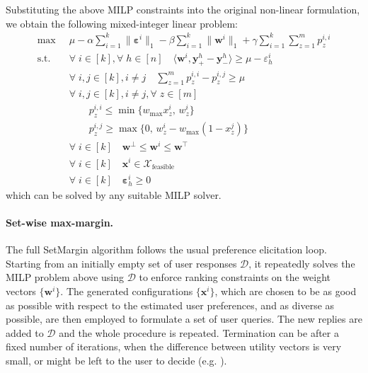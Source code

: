 \documentclass{article}
\renewcommand\[{\begin{equation}}
\renewcommand\]{\end{equation}}
\newcommand{\calvar}[1]{\ensuremath{\mathcal{#1}}}
\newcommand{\calD}{\calvar{D}}
\newcommand{\calX}{\calvar{X}}
\newcommand{\vecvar}[1]{\ensuremath{\boldsymbol{#1}}}
\newcommand{\vw}{\vecvar{w}}
\newcommand{\vx}{\vecvar{x}}
\newcommand{\vy}{\vecvar{y}}
\newcommand{\veps}{\vecvar{\varepsilon}}
\begin{document}
Substituting the above MILP constraints into the original non-linear
formulation, we obtain the following mixed-integer linear problem:
%
{\footnotesize
\begin{align}
    \max
        & \;\; \mu - \alpha \sum_{i=1}^k \| \veps^{i} \|_1 - \beta \sum_{i=1}^k \| \vw^{i} \|_1 + \gamma \sum_{i=1}^k \sum_{z=1}^m p^{i,i}_z
        \nonumber
    \\
    \text{s.t.}
        & \;\; \forall \; i \in [k], \forall \; h \in [n] \quad \langle \vw^{i}, \vy^{h}_+ - \vy^{h}_- \rangle \ge \mu - \varepsilon^{i}_h \nonumber
    \\
        & \;\; \forall \; i, j \in [k], i \neq j \quad \sum_{z=1}^m p^{i,i}_z - p^{i,j}_z \ge \mu
    \\
        & \;\; \forall \; i, j \in [k], i \neq j, \forall \; z \in [m] \nonumber
    \\
        & \;\; \qquad p^{i,i}_z \le \min \{ w_\text{max} x^{i}_z, \, w^{i}_z \} \label{eq:volatile1}
    \\
        & \;\; \qquad p^{i,j}_z \ge \max \{ 0, \, w^{i}_z - w_\text{max}(1 - x^{j}_z) \} \label{eq:volatile2}
    \\
        & \;\; \forall \; i \in [k] \quad \vw^\bot \le \vw^{i} \le \vw^\top \label{eq:wbounds2}
    \\
        & \;\; \forall \; i \in [k] \quad \vx^{i} \in \calX_{\text{feasible}} \nonumber
    \\
        & \;\; \forall \; i \in [k] \quad \veps^{i}_h \ge 0 \nonumber
\end{align}
}
%
which can be solved by any suitable MILP solver.

\paragraph{Set-wise max-margin.} The full {\sc SetMargin} algorithm
follows the usual preference elicitation loop. Starting from an
initially empty set of user responses $\calD$, it repeatedly solves
the MILP problem above using $\calD$ to enforce ranking
constraints on the weight vectors $\{\vw^i\}$. The generated
configurations $\{\vx^i\}$, which are chosen to be as good as possible
with respect to the estimated user preferences, and as diverse as
possible, are then employed to formulate a set of user queries. The
new replies are added to $\calD$ and the whole procedure is
repeated. Termination can be after a fixed number of iterations,
when the difference between utility vectors is very small, or might be left
to the user to decide (e.g. \cite{Reilly2007}).
\end{document}
